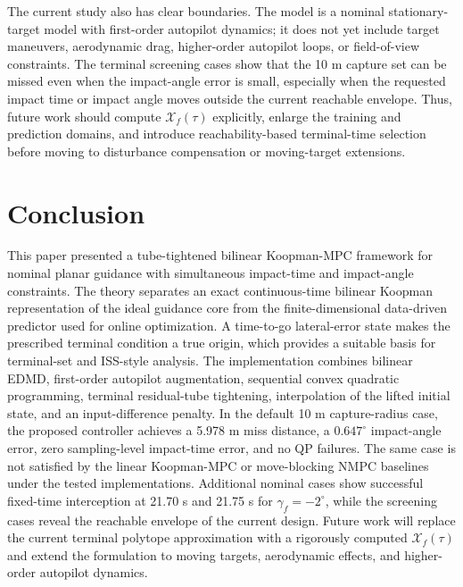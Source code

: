 \documentclass[letterpaper,journal]{IEEEtran}
\begin{document}
The current study also has clear boundaries. The model is a nominal stationary-target model with first-order autopilot dynamics; it does not yet include target maneuvers, aerodynamic drag, higher-order autopilot loops, or field-of-view constraints. The terminal screening cases show that the 10 m capture set can be missed even when the impact-angle error is small, especially when the requested impact time or impact angle moves outside the current reachable envelope. Thus, future work should compute $\mathcal X_f(\tau)$ explicitly, enlarge the training and prediction domains, and introduce reachability-based terminal-time selection before moving to disturbance compensation or moving-target extensions.

\section{Conclusion}
This paper presented a tube-tightened bilinear Koopman-MPC framework for nominal planar guidance with simultaneous impact-time and impact-angle constraints. The theory separates an exact continuous-time bilinear Koopman representation of the ideal guidance core from the finite-dimensional data-driven predictor used for online optimization. A time-to-go lateral-error state makes the prescribed terminal condition a true origin, which provides a suitable basis for terminal-set and ISS-style analysis. The implementation combines bilinear EDMD, first-order autopilot augmentation, sequential convex quadratic programming, terminal residual-tube tightening, interpolation of the lifted initial state, and an input-difference penalty. In the default 10 m capture-radius case, the proposed controller achieves a 5.978 m miss distance, a $0.647^\circ$ impact-angle error, zero sampling-level impact-time error, and no QP failures. The same case is not satisfied by the linear Koopman-MPC or move-blocking NMPC baselines under the tested implementations. Additional nominal cases show successful fixed-time interception at 21.70 s and 21.75 s for $\gamma_f=-2^\circ$, while the screening cases reveal the reachable envelope of the current design. Future work will replace the current terminal polytope approximation with a rigorously computed $\mathcal X_f(\tau)$ and extend the formulation to moving targets, aerodynamic effects, and higher-order autopilot dynamics.
\end{document}
